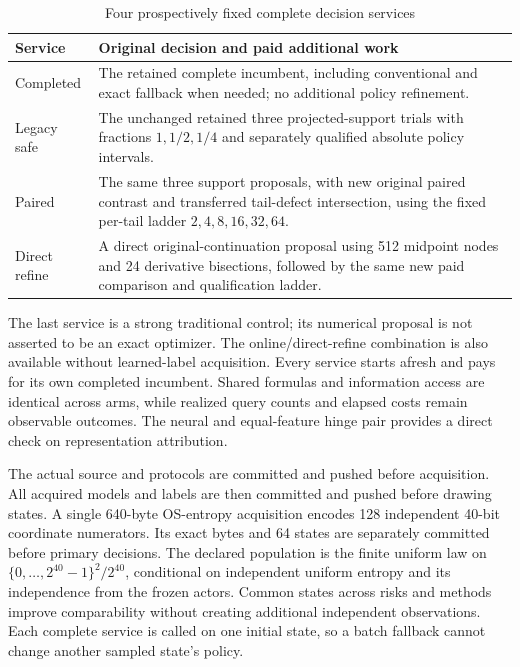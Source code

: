 \begin{table}[t]
\centering\small
\caption{Four prospectively fixed complete decision services}
\label{tab:services120}
\begin{tabular}{p{}p{}}
\toprule
Service & Original decision and paid additional work\\
\midrule
Completed & The retained complete incumbent, including conventional and exact
fallback when needed; no additional policy refinement.\\[3pt]
Legacy safe & The unchanged retained three projected-support trials with
fractions $1,1/2,1/4$ and separately qualified absolute policy intervals.\\[3pt]
Paired & The same three support proposals, with new original paired contrast
and transferred tail-defect intersection, using the fixed per-tail ladder
$2,4,8,16,32,64$.\\[3pt]
Direct refine & A direct original-continuation proposal using 512 midpoint
nodes and 24 derivative bisections, followed by the same new paid comparison
and qualification ladder.\\
\bottomrule
\end{tabular}
\end{table}

The last service is a strong traditional control; its numerical proposal is
not asserted to be an exact optimizer. The online/direct-refine combination is
also available without learned-label acquisition. Every service starts afresh
and pays for its own completed incumbent. Shared formulas and information access
are identical across arms, while realized query counts and elapsed costs remain
observable outcomes. The neural and equal-feature hinge pair provides a direct
check on representation attribution.

The actual source and protocols are committed and pushed before acquisition.
All acquired models and labels are then committed and pushed before drawing
states. A single 640-byte OS-entropy acquisition encodes 128 independent
40-bit coordinate numerators. Its exact bytes and 64 states are separately
committed before primary decisions. The declared population is the finite
uniform law on $\{0,\ldots,2^{40}-1\}^2/2^{40}$, conditional on independent
uniform entropy and its independence from the frozen actors. Common states
across risks and methods improve comparability without creating additional
independent observations. Each complete service is called on one initial state,
so a batch fallback cannot change another sampled state's policy.

